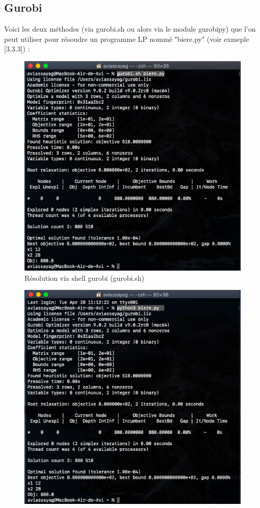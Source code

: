 \documentclass[a4paper, 12pt, twoside]{article}
\begin{document}
{{{{{\subsection{Gurobi}
Voici les deux méthodes (via gurobi.sh ou alors via le module gurobipy) que l'on peut utiliser pour résoudre un programme LP nommé "biere.py" (voir exmeple [3.3.3]) :
\begin{center}
\begin{figure}[h]
\centering
\includegraphics[scale=0.4]{gurobish.png}
\caption{Résolution via shell gurobi (gurobi.sh)}
\end{figure}
\begin{figure}[h]
\centering
\includegraphics[scale=0.4]{gurobipython.png}

\end{figure}
\end{center}}}}}}
\end{document}
